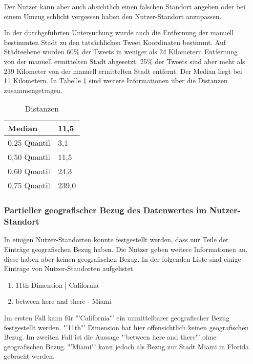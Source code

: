 				Der Nutzer kann aber auch absichtlich einen falschen Standort angeben oder bei einem Umzug schlicht vergessen haben den Nutzer-Standort anzupassen.

				In der durchgeführten Untersuchung wurde auch die Entfernung der manuell bestimmten Stadt zu den tatsächlichen Tweet Koordinaten bestimmt.
				Auf Städteebene wurden 60\% der Tweets in weniger als 24 Kilometern Entfernung von der manuell ermittelten Stadt abgesetzt.
				25\% der Tweets sind aber mehr als 239 Kilometer von der manuell ermittelten Stadt entfernt. 
				Der Median liegt bei 11 Kilometern.
				In Tabelle \ref{tab:distancesP} sind weitere Informationen über die Distanzen zusammengetragen.

				\begin{table}[h]
				\centering
				\caption{Distanzen}
				\label{tab:distancesP}
				\begin{tabular}{|l|l|}
				\hline
				Median       & 11,5  \\ \hline
				0,25 Quantil & 3,1   \\ \hline
				0,50 Quantil & 11,5  \\ \hline
				0,60 Quantil & 24,3  \\ \hline
				0,75 Quantil & 239,0 \\ \hline
				\end{tabular}
				\end{table}



			\subsubsection{Partieller geografischer Bezug des Datenwertes im Nutzer-Standort} \label{subsec:partiellerGeografischerBezug} 

				In einigen Nutzer-Standorten konnte festgestellt werden, dass nur Teile der Einträge geografischen Bezug haben. 
				Die Nutzer geben weitere Informationen an, diese haben aber keinen geografischen Bezug. 
				In der folgenden Liste sind einige Einträge von Nutzer-Standorten aufgelistet. 

				\begin{enumerate}
					\item 11th Dimension | California
					\item between here and there - Miami
				\end{enumerate}

				Im ersten Fall kann für "'California"' ein unmittelbarer geografischer Bezug festgestellt werden.
				"'11th"' Dimension hat hier offensichtlich keinen geografischen Bezug.
				Im zweiten Fall ist die Aussage "'between here and there"' ohne geografischen Bezug.
				"'Miami"' kann jedoch als Bezug zur Stadt Miami in Florida gebracht werden.
				
